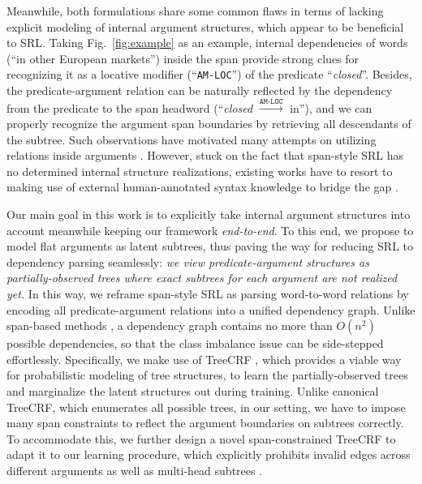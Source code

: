 \documentclass[11pt]{article}
\newcommand{\brickred}[1]{\textcolor{brickred}{#1}}
\begin{document}
Meanwhile, both formulations share some common flaws in terms of lacking explicit modeling of internal argument structures, which appear to be beneficial to SRL.
Taking Fig.~\ref{fig:example} as an example, internal dependencies of words (``in other European markets'') inside the span provide strong clues for recognizing it as a locative modifier (``\texttt{AM-LOC}'') of the predicate ``\emph{\brickred{closed}}''.
Besides, the predicate-argument relation can be naturally reflected by the dependency from the predicate to the span headword (``\emph{\brickred{closed}} $\xrightarrow{\texttt{AM-LOC}}$ in''), and we can properly recognize the argument span boundaries by retrieving all descendants of the subtree.
Such observations have motivated many attempts on utilizing relations inside arguments \cite[\emph{inter alia}]{gildea-hockenmaier-2003-identifying,johansson-nugues-2008-dependency,johansson-nugues-2008-effect,xia-etal-2019-syntax,li-etal-2019-dependency}.
However, stuck on the fact that span-style SRL has no determined internal structure realizations, existing works have to resort to making use of external human-annotated syntax knowledge to bridge the gap \cite{shi-etal-2020-semantic,li-etal-2021-syntax}.



Our main goal in this work is to explicitly take internal argument structures into account meanwhile keeping our framework \emph{end-to-end}.
To this end, we propose to model flat arguments as latent subtrees, thus paving the way for reducing SRL to dependency parsing seamlessly: \emph{we view predicate-argument structures as partially-observed trees where exact subtrees for each argument are not realized yet.}
In this way, we reframe span-style SRL as parsing word-to-word relations by encoding all predicate-argument relations into a unified dependency graph.
Unlike span-based methods \cite{he-etal-2018-jointly}, a dependency graph contains no more than $O(n^2)$ possible dependencies, so that the class imbalance issue can be side-stepped effortlessly.
Specifically, we make use of TreeCRF \cite{eisner-2000-bilexical,zhang-etal-2020-efficient}, which provides a viable way for probabilistic modeling of tree structures, to learn the partially-observed trees and marginalize the latent structures out during training.
Unlike canonical TreeCRF, which enumerates all possible trees, in our setting, we have to impose many span constraints to reflect the argument boundaries on subtrees correctly.
To accommodate this, we further design a novel span-constrained TreeCRF to adapt it to our learning procedure, which explicitly prohibits invalid edges across different arguments as well as multi-head subtrees \cite{nivre-etal-2014-squibs,zhang-etal-2021-adapting}.
\end{document}
